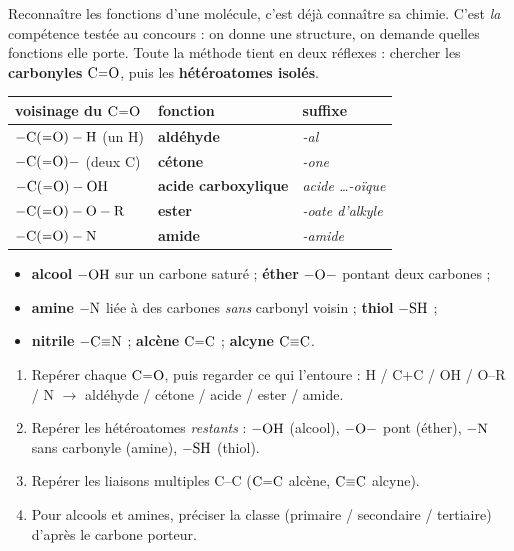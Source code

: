 \documentclass[11pt,a4paper]{article}
\begin{document}

Reconnaître les fonctions d'une molécule, c'est déjà connaître sa chimie. C'est \emph{la} compétence testée au concours : on donne une structure, on demande quelles fonctions elle porte. Toute la méthode tient en deux réflexes : chercher les \textbf{carbonyles} $\ce{C=O}$, puis les \textbf{hétéroatomes isolés}.

\begin{cle}[Un carbonyle $\ce{C=O}$, cinq fonctions selon le voisinage]
\begin{center}\small
\renewcommand{\arraystretch}{1.25}
\begin{tabular}{lll}
\toprule
voisinage du $\ce{C=O}$ & fonction & suffixe \\
\midrule
$-\ce{C(=O)}-\ce{H}$ (un H) & \textbf{aldéhyde} & \textit{-al} \\
$-\ce{C(=O)}-$ (deux C) & \textbf{cétone} & \textit{-one} \\
$-\ce{C(=O)}-\ce{OH}$ & \textbf{acide carboxylique} & \textit{acide \dots-oïque} \\
$-\ce{C(=O)}-\ce{O}-\ce{R}$ & \textbf{ester} & \textit{-oate d'alkyle} \\
$-\ce{C(=O)}-\ce{N}$ & \textbf{amide} & \textit{-amide} \\
\bottomrule
\end{tabular}
\end{center}
\end{cle}

\begin{cle}
\begin{itemize}[leftmargin=1.6em,itemsep=0.5pt]
  \item \textbf{alcool} $-\ce{OH}$ sur un carbone saturé ; \quad \textbf{éther} $-\ce{O}-$ pontant deux carbones ;
  \item \textbf{amine} $-\ce{N}$ liée à des carbones \emph{sans} carbonyl voisin ; \quad \textbf{thiol} $-\ce{SH}$ ;
  \item \textbf{nitrile} $-\ce{C#N}$ ; \quad \textbf{alcène} $\ce{C=C}$ ; \quad \textbf{alcyne} $\ce{C#C}$.
\end{itemize}
\end{cle}

\begin{methode}
\begin{enumerate}[leftmargin=1.6em,itemsep=0.5pt]
  \item Repérer chaque $\ce{C=O}$, puis regarder ce qui l'entoure : H / C+C / OH / O--R / N $\rightarrow$ aldéhyde / cétone / acide / ester / amide.
  \item Repérer les hétéroatomes \emph{restants} : $-\ce{OH}$ (alcool), $-\ce{O}-$ pont (éther), $-\ce{N}$ sans carbonyle (amine), $-\ce{SH}$ (thiol).
  \item Repérer les liaisons multiples C--C ($\ce{C=C}$ alcène, $\ce{C#C}$ alcyne).
  \item Pour alcools et amines, préciser la classe (primaire / secondaire / tertiaire) d'après le carbone porteur.
\end{enumerate}
\end{methode}
\end{document}
